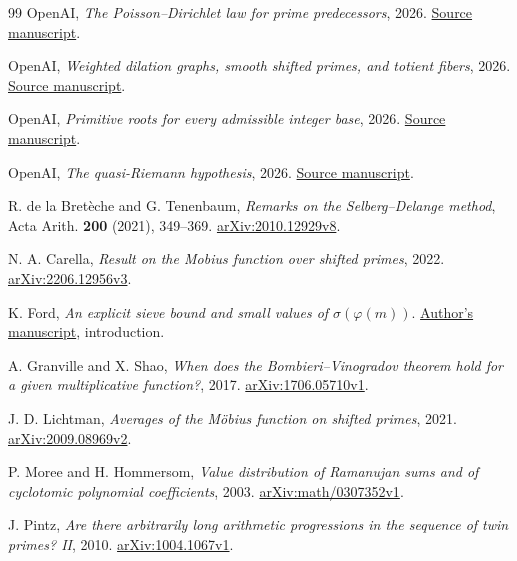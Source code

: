 \begin{thebibliography}{99}
OpenAI,
\emph{The Poisson--Dirichlet law for prime predecessors}, 2026.
\href{https://github.com/openai/math/tree/fd4aeeb2ee4fc729c18d98444fed42fd0529eeeb/preprints/The-Poisson-Dirichlet-Law-for-Prime-Predecessors-September-24-2026/build}{Source manuscript}.

OpenAI,
\emph{Weighted dilation graphs, smooth shifted primes, and totient fibers}, 2026.
\href{https://github.com/openai/math/tree/fd4aeeb2ee4fc729c18d98444fed42fd0529eeeb/preprints/Weighted-Dilation-Graphs-Smooth-Shifted-Primes-and-Totient-Fibers-September-24-2026/build}{Source manuscript}.

OpenAI,
\emph{Primitive roots for every admissible integer base}, 2026.
\href{https://github.com/openai/math/tree/fd4aeeb2ee4fc729c18d98444fed42fd0529eeeb/preprints/Primitive-roots-for-every-admissible-integer-base-October-4-2026/build}{Source manuscript}.

OpenAI,
\emph{The quasi-Riemann hypothesis}, 2026.
\href{https://github.com/openai/math/tree/fd4aeeb2ee4fc729c18d98444fed42fd0529eeeb/preprints/The-Quasi-Riemann-Hypothesis-September-30-2026/build}{Source manuscript}.

R. de la Bret\`eche and G. Tenenbaum,
\emph{Remarks on the Selberg--Delange method},
Acta Arith. \textbf{200} (2021), 349--369.
\href{https://arxiv.org/abs/2010.12929v8}{arXiv:2010.12929v8}.

N. A. Carella,
\emph{Result on the Mobius function over shifted primes}, 2022.
\href{https://arxiv.org/abs/2206.12956v3}{arXiv:2206.12956v3}.

K. Ford,
\emph{An explicit sieve bound and small values of $\sigma(\varphi(m))$}.
\href{https://www.ford126.web.illinois.edu/wwwpapers/sigphi.pdf}{Author's manuscript}, introduction.

A. Granville and X. Shao,
\emph{When does the Bombieri--Vinogradov theorem hold for a given
multiplicative function?}, 2017.
\href{https://arxiv.org/abs/1706.05710v1}{arXiv:1706.05710v1}.

J. D. Lichtman,
\emph{Averages of the M\"obius function on shifted primes}, 2021.
\href{https://arxiv.org/abs/2009.08969v2}{arXiv:2009.08969v2}.

P. Moree and H. Hommersom,
\emph{Value distribution of Ramanujan sums and of cyclotomic
polynomial coefficients}, 2003.
\href{https://arxiv.org/abs/math/0307352v1}{arXiv:math/0307352v1}.

J. Pintz,
\emph{Are there arbitrarily long arithmetic progressions in the
sequence of twin primes? II}, 2010.
\href{https://arxiv.org/abs/1004.1067v1}{arXiv:1004.1067v1}.
\end{thebibliography}
